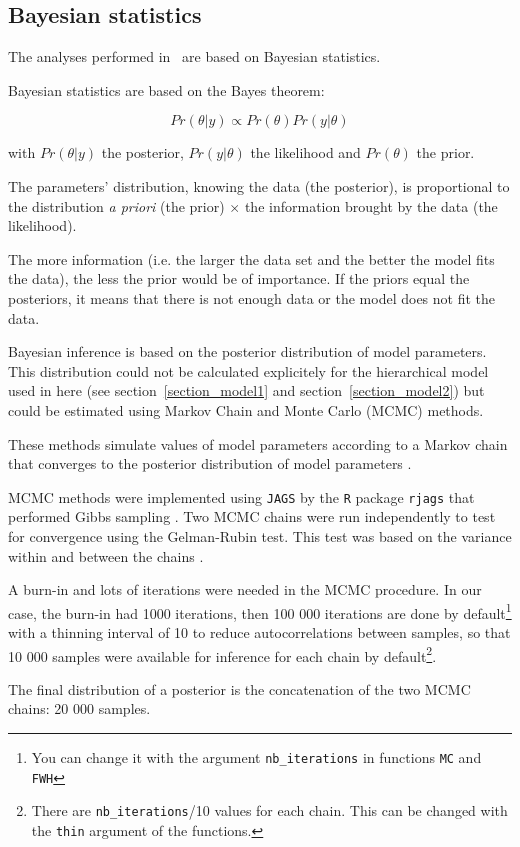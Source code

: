 \subsection{Bayesian statistics}
\label{section_bayes}

The analyses performed in \pack~are based on Bayesian statistics.

Bayesian statistics are based on the Bayes theorem:

\begin{displaymath}
Pr(\theta|y) \propto Pr(\theta) Pr(y|\theta)
\end{displaymath}

with 
$Pr(\theta|y)$ the posterior, 
$Pr(y|\theta)$ the likelihood and 
$Pr(\theta)$ the prior.

The parameters' distribution, knowing the data (the posterior), is proportional to the distribution \textit{a  priori} (the prior) $\times$ the information brought by the data (the likelihood).

The more information (i.e. the larger the data set and the better the model fits the data), the less the prior would be of importance.
If the priors equal the posteriors, it means that there is not enough data or the model does not fit the data.


Bayesian inference is based on the posterior distribution of model parameters.
This distribution could not be calculated explicitely for the hierarchical model used in here (see section~\ref{section_model1} and section~\ref{section_model2}) but could be estimated using Markov Chain and Monte Carlo (MCMC) methods.

These methods simulate values of model parameters according to a Markov chain that converges to the posterior distribution of model parameters \citep{robert_bayesian_2001}.

MCMC methods were implemented using \texttt{JAGS} by the \texttt{R} package \texttt{rjags} that performed Gibbs sampling \citep{robert_bayesian_2001}.
Two MCMC chains were run independently to test for convergence using the Gelman-Rubin test.
This test was based on the variance within and between the chains \citep{gelman_inference_1992}.

A burn-in and lots of iterations were needed in the MCMC procedure.
In our case, the burn-in had 1000 iterations, then 100 000 iterations are done by default\footnote{You can change it with the argument \texttt{nb\_iterations} in functions \texttt{MC} and \texttt{FWH}} with a thinning interval of 10 to reduce autocorrelations between samples, so that 10 000 samples were available for inference for each chain by default\footnote{There are \texttt{nb\_iterations}/10 values for each chain. This can be changed with the \texttt{thin} argument of the functions.}.
 
The final distribution of a posterior is the concatenation of the two MCMC chains: 20 000 samples.

